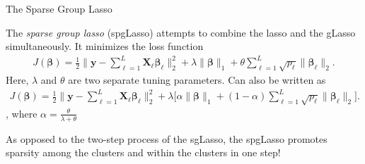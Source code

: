 \documentclass[8pt]{beamer}
\newcommand{\mydef}[1]{\textcolor{SteelBlue3}{\textit{#1}}} %
\begin{document}
\begin{frame}{The Sparse Group Lasso}

The \mydef{sparse group lasso} (spgLasso) %
\cite{friedman2010note} 
attempts to combine the lasso and the gLasso simultaneously. It minimizes the loss function 
\begin{align*}
    J(\bm{\beta}) = \frac{1}{2} \| \mathbf{y}  - \sum_{\ell=1}^L \mathbf{X}_{\ell} \bm{\beta}_{\ell} \|_2^2 + \lambda \| \bm{\beta} \|_1 + \theta \sum_{\ell=1}^L \sqrt{p_{\ell}} \| \bm{\beta}_{\ell} \|_2.
\end{align*} 
Here, $\lambda$ and $\theta$ are two separate tuning parameters. %
Can also be written as 
\begin{align*}
    J(\bm{\beta}) = \frac{1}{2} \| \mathbf{y}  - \sum_{\ell=1}^L \mathbf{X}_{\ell} \bm{\beta}_{\ell} \|_2^2 + \lambda \Big[ \alpha \| \bm{\beta} \|_1 + (1 - \alpha) \sum_{\ell=1}^L \sqrt{p_{\ell}} \| \bm{\beta}_{\ell} \|_2 \Big].
\end{align*},
where $\alpha = \frac{\theta}{\lambda + \theta}$

As opposed to the two-step process of the sgLasso, the spgLasso promotes sparsity among the clusters and within the clusters in one step!
    
\end{frame}
\end{document}
